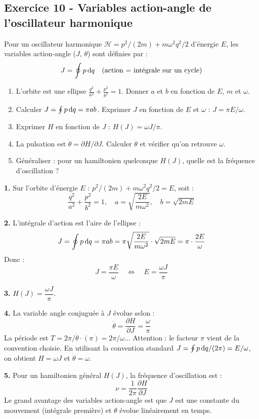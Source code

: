 \documentclass[12pt,a4paper]{article}
\begin{document}
\subsection*{Exercice 10 - Variables action-angle de l'oscillateur harmonique \niveau{\difficile}}

\begin{boiteexercice}
Pour un oscillateur harmonique $\mathcal{H} = p^2/(2m) + m\omega^2 q^2/2$ d'énergie $E$, les variables action-angle ($J$, $\theta$) sont définies par :
\[
J = \oint p\,\mathrm{d} q \quad\text{(action = intégrale sur un cycle)}
\]
\begin{enumerate}
  \item L'orbite est une ellipse $\frac{q^2}{a^2}+\frac{p^2}{b^2}=1$. Donner $a$ et $b$ en fonction de $E$, $m$ et $\omega$.
  \item Calculer $J = \oint p\,\mathrm{d} q = \pi ab$. Exprimer $J$ en fonction de $E$ et $\omega$ : $J = \pi E/\omega$.
  \item Exprimer $H$ en fonction de $J$ : $H(J) = \omega J/\pi$.
  \item La pulsation est $\dot\theta = \partial H/\partial J$. Calculer $\dot\theta$ et vérifier qu'on retrouve $\omega$.
  \item Généraliser : pour un hamiltonien quelconque $H(J)$, quelle est la fréquence d'oscillation ?
\end{enumerate}
\end{boiteexercice}

\begin{boitecorrige}
\textbf{1.} Sur l'orbite d'énergie $E$ : $p^2/(2m)+m\omega^2 q^2/2=E$, soit :
\[
\frac{q^2}{a^2}+\frac{p^2}{b^2}=1, \quad a = \sqrt{\frac{2E}{m\omega^2}}, \quad b = \sqrt{2mE}
\]

\textbf{2.} L'intégrale d'action est l'aire de l'ellipse :
\[
J = \oint p\,\mathrm{d} q = \pi ab = \pi\sqrt{\frac{2E}{m\omega^2}}\cdot\sqrt{2mE} = \pi\cdot\frac{2E}{\omega}
\]
Donc :
\[
\boxed{J = \frac{\pi E}{\omega}} \quad\Longleftrightarrow\quad E = \frac{\omega J}{\pi}
\]

\textbf{3.} $H(J) = \dfrac{\omega J}{\pi}$.

\textbf{4.} La variable angle conjuguée à $J$ évolue selon :
\[
\dot\theta = \frac{\partial H}{\partial J} = \frac{\omega}{\pi}
\]
La période est $T = 2\pi/\dot\theta \cdot (\pi) = 2\pi/\omega$... Attention : le facteur $\pi$ vient de la convention choisie. En utilisant la convention standard $J = \oint p\,\mathrm{d} q/(2\pi) = E/\omega$, on obtient $H = \omega J$ et $\dot\theta = \omega$.

\textbf{5.} Pour un hamiltonien général $H(J)$, la fréquence d'oscillation est :
\[
\nu = \frac{1}{2\pi}\frac{\partial H}{\partial J}
\]
Le grand avantage des variables action-angle est que $J$ est une constante du mouvement (intégrale première) et $\theta$ évolue linéairement en temps.
\end{boitecorrige}
\end{document}
